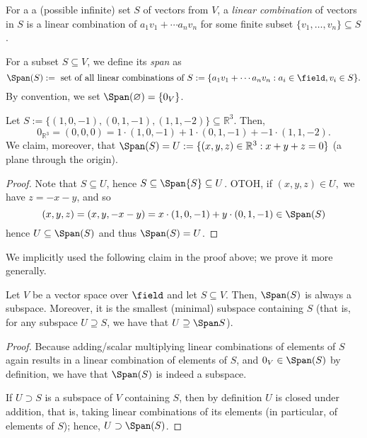 \begin{definition}
    For a a (possible infinite) set $S$ of vectors from $V$, a \emph{linear combination} of vectors in $S$ is a linear combination of $a_1 v_1 + \cdots a_n v_n$ for some finite subset $\{v_1, \dots, v_n\} \subseteq S$.\footnotemark
\end{definition}

\begin{definition}[Span]
    For a subset $S \subseteq V$, we define its \emph{span} as \[
    \Span(S):= \text{ set of all linear combinations of } S := \{a_1 v_1 + \cdots a_n v_n : a_i \in \field, v_i \in S\}.    
    \]
    By convention, we set $\Span(\varnothing) = \{0_V\}$.
\end{definition}
\begin{example}
    Let $S := \{(1, 0, -1), (0, 1, -1), (1, 1, -2)\} \subseteq \mathbb{R}^3$. Then, \[
    0_{\mathbb{R}^3} =(0,0,0) = 1 \cdot (1, 0, -1) + 1 \cdot (0, 1, -1) + -1 \cdot (1, 1, -2).
    \]
    We claim, moreover, that $\Span (S) = U := \{(x, y, z) \in \mathbb{R}^3 : x+y+z = 0\}$ (a plane through the origin).
    \begin{proof}
        Note that $S \subseteq U$, hence $S \subseteq \Span{S} \subseteq U$. OTOH, if $(x, y, z) \in U, $ we have $z = - x - y$, and so \[
        (x, y, z) = (x, y, -x - y) = x\cdot (1, 0, -1) + y \cdot (0, 1, -1) \in \Span (S)    
        \]
        hence $U \subseteq \Span (S)$ and thus $\Span (S) = U$.
    \end{proof}
\end{example}

\begin{remark}
    We implicitly used the following claim in the proof above; we prove it more generally.
\end{remark}
\begin{proposition}
    Let $V$ be a vector space over $\field$ and let $S \subseteq V$. Then, $\Span (S)$ is always a subspace. Moreover, it is the smallest (minimal) subspace containing $S$ (that is, for any subspace $U \supseteq S$, we have that $U \supseteq \Span S$).
\end{proposition}

\begin{proof}
    Because adding/scalar multiplying linear combinations of elements of $S$ again results in a linear combination of elements of $S$, and $0_V \in \Span (S)$ by definition, we have that $\Span (S)$ is indeed a subspace.

    If $U \supset S$ is a subspace of $V$ containing $S$, then by definition $U$ is closed under addition, that is, taking linear combinations of its elements (in particular, of elements of $S$); hence, $U \supset \Span (S)$.
\end{proof}

